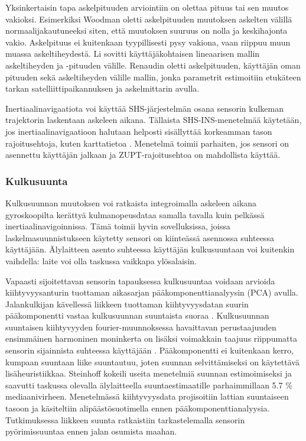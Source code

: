 Yksinkertaisin tapa askelpituuden arviointiin on olettaa pituus tai
sen muutos vakioksi. Esimerkiksi Woodman \cite{woodman2008} oletti
askelpituuden muutoksen askelten välillä normaalijakautuneeksi siten,
että muutoksen suuruus on nolla ja keskihajonta vakio. Askelpituus
ei kuitenkaan tyypillisesti pysy vakiona, vaan riippuu muun muassa
askeltiheydestä. Li \cite{li2012} sovitti käyttäjäkohtaisen lineaarisen
mallin askeltiheyden ja -pituuden välille. Renaudin
\cite{renaudin2013} oletti askelpituuden, käyttäjän oman pituuden sekä
askeltiheyden välille mallin, jonka parametrit estimoitiin etukäteen
tarkan satelliittipaikannuksen ja askelmittarin avulla.

Inertiaalinavigaatiota voi käyttää SHS-järjestelmän osana sensorin
kulkeman trajektorin
laskentaan askeleen aikana. Tällaista SHS-INS-menetelmää käytetään,
jos inertiaalinavigaatioon halutaan helposti sisällyttää korkeamman
tason rajoitusehtoja, kuten karttatietoa \cite{woodman2008}. Menetelmä
toimii parhaiten, jos sensori on asennettu käyttäjän jalkaan ja
ZUPT-rajoitusehtoa on mahdollista käyttää.

\subsubsection{Kulkusuunta}

Kulkusuunnan muutoksen voi ratkaista integroimalla askeleen aikana
gyroskoopilta kerättyä kulmanopeusdataa samalla tavalla kuin pelkässä
inertiaalinavigoinnissa. Tämä toimii hyvin sovelluksissa, joissa
laskelmasuunnistukseen käytetty sensori on kiinteässä asennossa suhteessa
käyttäjään. Älylaitteen asento suhteessa käyttäjän kulkusuuntaan voi
kuitenkin vaihdella: laite voi olla taskussa vaikkapa ylösalaisin.

Vapaasti sijoitettavan sensorin tapauksessa kulkusuuntaa voidaan arvioida
kiihtyvyysanturin tuottaman aikasarjan pääkomponenttianalyysin (PCA) avulla.
Jalankulkijan kävellessä liikkeen tuottaman kiihtyvyysdatan suurin
pääkomponentti vastaa kulkusuunnan suuntaista suoraa \cite{steinhoff2010}.
Kulkusuunnan suuntaisen kiihtyvyyden fourier-muunnoksessa havaittavan
perustaajuuden ensimmäinen harmoninen moninkerta on lisäksi voimakkain
taajuus riippumatta sensorin sijainnista suhteessa käyttäjään
\cite{rai2012}.
Pääkomponentti ei
kuitenkaan kerro, kumpaan suuntaan liike suuntautuu, joten suunnan
selvittämiseksi on käytettävä lisäheuristiikkaa. Steinhoff
\cite{steinhoff2010} kokeili useita menetelmiä suunnan estimoimiseksi
ja saavutti taskussa olevalla älylaitteella suuntaestimaatille parhaimmillaan
5.7 \% mediaanivirheen. Menetelmässä kiihtyvyysdata projisoitiin lattian
suuntaiseen tasoon ja käsiteltiin alipäästösuotimella ennen
pääkomponenttianalyysia. Tutkimuksessa liikkeen suunta ratkaistiin
tarkastelemalla sensorin pyörimissuuntaa ennen jalan osumista maahan.

